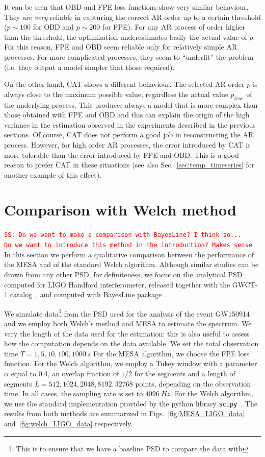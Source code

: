 \documentclass{aa}
\newcommand{\sschmidt}[1]{{\textcolor{red}{\texttt{SS: #1}} }}
\begin{document}
It can be seen that OBD and FPE loss functions show very similar behaviour. They are {\it very} reliable in capturing the correct AR order up to a certain threshold ($p\sim 100$ for OBD and $p\sim 200$ for FPE). For any AR process of order higher than the threshold, the optimization underestimates badly the actual value of $p$.
For this reason, FPE and OBD seem reliable only for relatively simple AR processes. For more complicated processes, they seem to ``underfit'' the problem (i.e. they output a model simpler that those required).

On the other hand, CAT shows a different behaviour. The selected AR order $p$ is always close to the maximum possible value, regardless the actual value $p_{true}$ of the underlying process. This produces always a model that is more complex than those obtained with FPE and OBD and this can explain the origin of the high variance in the estimation observed in the experiments described in the previous sections.
Of course, CAT does not perform a good job in reconstructing the AR process. However, for high order AR processes, the error introduced by CAT is more tolerable than the error introduced by FPE and OBD. This is a good reason to prefer CAT in these situations (see also Sec.~\ref{sec:temp_timeseries} for another example of this effect).

\section{Comparison with Welch method}\label{sec:Welch_comparison}
\sschmidt{Do we want to make a comparison with BayesLine? I think so... \\ Do we want to introduce this method in the introduction? Makes sense}
In this section we perform a qualitative comparison between the performance of the MESA and of the standard Welch algorithm.
Although similar studies can be drawn from any other PSD, for definiteness, we focus on the analytical PSD computed for LIGO Handford interferometer, released together with the GWCT-1 catalog~\citep{GWTC1, PSD_release}, and computed with BayesLine package \citep{Cornish_2015, Littenberg_2015, Cornish_2020, Chatziioannou_2019}.

We simulate data\footnote{This is to ensure that we have a baseline PSD to compare the data with} from the PSD used for the analysis of the event GW150914 and we employ both Welch's method and MESA to estimate the spectrum.
We vary the length of the data used for the estimation: this is also useful to assess how the computation depends on the data available. We set the total observation time $T = 1, 5, 10, 100, 1000 \SI{}{s}$
For the MESA algorithm, we choose the FPE loss function. For the Welch algorithm, we employ a Tukey window with a parameter $\alpha$ 
equal to 0.4, an overlap fraction of $1/2$ for the segments and a length of 
segments $L = 512, 1024, 2048, 8192, 32768$ points, depending on the observation time.
In all cases, the sampling rate is set to $\SI{4096}{Hz}$.
For the Welch algorithm, we use the standard implementation provided by the python library \texttt{scipy}~\citep{numpy,scipy}.
The results from both methods are summarized in  Figs.~\ref{fig:MESA_LIGO_data} and~\ref{fig:welch_LIGO_data} respectively.
\end{document}
